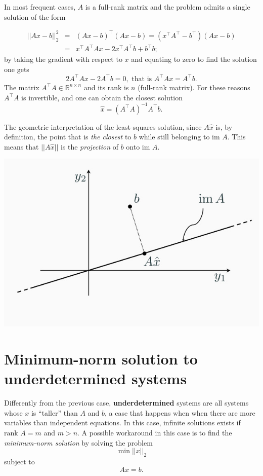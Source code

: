\documentclass[10pt]{report}
\begin{document}
In most frequent cases, \(A\) is a full\--rank matrix and the problem admits a single solution of the form

\[
\begin{array}{rcl} || Ax - b || ^2_2 & = & (Ax - b)^\top (Ax - b) = (x^\top A^\top - b^\top)(Ax - b) \\ & = & x^\top A^\top A x - 2 x^\top A^\top b + b^\top b;\end{array}\] by taking the gradient with respect to \(x\) and equating to zero to find the solution one gets \[2A^\top A x - 2A^\top b = 0, \mbox{ that is } A^\top A x = A^\top b.\] The matrix \(A^\top A \in \mathbb{R}^{n \times n}\) and its rank is \(n\) (full\--rank matrix). For these reasons \(A^\top A\) is invertible, and one can obtain the closest solution $$\hat x = (A^\top A)^{-1}A^\top b.$$

The geometric interpretation of the least\--squares solution, since \(A\hat x\) is, by definition, the point that is \emph{the closest} to \(b\) while still belonging to \(\mbox{im }A\). This means that \(||A\hat x||\) is the \emph{projection} of \(b\) onto \(\mbox{im }A\).

\begin{center}
\includegraphics[scale=0.3]{./pics/alg/lsas.jpg}
\end{center}
\section{Minimum\--norm solution to underdetermined systems}
\label{sec:org4714c8f}
Differently from the previous case, \textbf{underdetermined} systems are all systems whose \(x\) is ``taller'' than \(A\) and \(b\), a case that happens when when there are more variables than independent equations. In this case, infinite solutions exists if \(\mbox{rank }A = m\) and \(m > n\). A possible workaround in this case is to find the \emph{minimum\--norm solution} by solving the problem $$\min||x||_2$$ subject to $$Ax = b.$$
\end{document}
